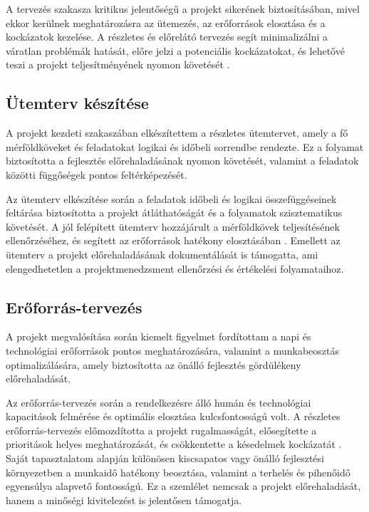 A tervezés szakasza kritikus jelentőségű a projekt sikerének biztosításában, mivel ekkor kerülnek meghatározásra az ütemezés, az erőforrások elosztása és a kockázatok kezelése. 
A részletes és előrelátó tervezés segít minimalizálni a váratlan problémák hatását, előre jelzi a potenciális kockázatokat, 
és lehetővé teszi a projekt teljesítményének nyomon követését \cite{Hajdu2014,Szalay2018,Kovacs2016,Kaposi2019}.

\subsection{Ütemterv készítése}

A projekt kezdeti szakaszában elkészítettem a részletes ütemtervet, amely a fő mérföldköveket és feladatokat logikai és időbeli sorrendbe rendezte.  
Ez a folyamat biztosította a fejlesztés előrehaladásának nyomon követését, valamint a feladatok közötti függőségek pontos feltérképezését.  

Az ütemterv elkészítése során a feladatok időbeli és logikai összefüggéseinek feltárása biztosította a projekt átláthatóságát és a folyamatok szisztematikus követését.  
A jól felépített ütemterv hozzájárult a mérföldkövek teljesítésének ellenőrzéséhez,  
és segített az erőforrások hatékony elosztásában \cite{Kovacs2016,Kaposi2019}.  
Emellett az ütemterv a projekt előrehaladásának dokumentálását is támogatta,  
ami elengedhetetlen a projektmenedzsment ellenőrzési és értékelési folyamataihoz.

\subsection{Erőforrás-tervezés}

A projekt megvalósítása során kiemelt figyelmet fordítottam a napi és technológiai erőforrások pontos meghatározására, valamint a munkabeosztás optimalizálására, 
amely biztosította az önálló fejlesztés gördülékeny előrehaladását.  

Az erőforrás-tervezés során a rendelkezésre álló humán és technológiai kapacitások felmérése és optimális elosztása kulcsfontosságú volt.  
A részletes erőforrás-tervezés előmozdította a projekt rugalmasságát, elősegítette a prioritások helyes meghatározását, és csökkentette a késedelmek kockázatát \cite{Hajdu2014,Szalay2018}.  
Saját tapasztalatom alapján különösen kiscsapatos vagy önálló fejlesztési környezetben a munkaidő hatékony beosztása, valamint a terhelés és pihenőidő egyensúlya alapvető fontosságú.  
Ez a szemlélet nemcsak a projekt előrehaladását, hanem a minőségi kivitelezést is jelentősen támogatja.

